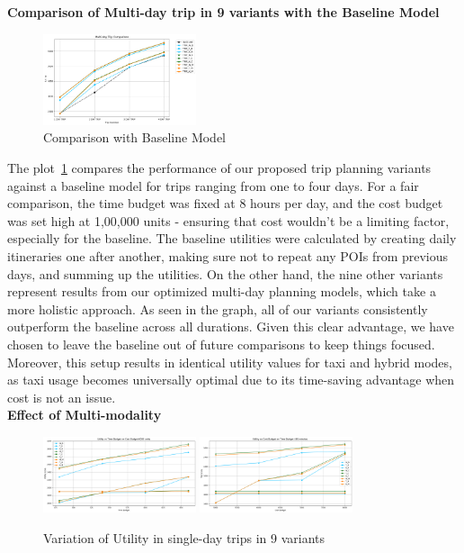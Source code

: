\newpage
\noindent \textbf{Comparison of Multi-day trip in 9 variants with the Baseline Model}
\begin{figure}[H]
\centering
\includegraphics[width=0.4\textwidth]{plots/baselineComparison.png}
\caption{Comparison with Baseline Model}
\label{fig:comparisonWithBaselinePlot}
\end{figure}

The plot~\ref{fig:comparisonWithBaselinePlot} compares the performance of our proposed trip planning variants against a baseline model for trips ranging from one to four days. For a fair comparison, the time budget was fixed at 8 hours per day, and the cost budget was set high at 1,00,000 units - ensuring that cost wouldn’t be a limiting factor, especially for the baseline. The baseline utilities were calculated by creating daily itineraries one after another, making sure not to repeat any POIs from previous days, and summing up the utilities. On the other hand, the nine other variants represent results from our optimized multi-day planning models, which take a more holistic approach. As seen in the graph, all of our variants consistently outperform the baseline across all durations. Given this clear advantage, we have chosen to leave the baseline out of future comparisons to keep things focused. Moreover, this setup results in identical utility values for taxi and hybrid modes, as taxi usage becomes universally optimal due to its time-saving advantage when cost is not an issue. \\

\noindent\textbf{Effect of Multi-modality}

\begin{figure}[H]
\includegraphics[width=0.4\textwidth]{plots/multimodality1.png}
\label{fig:mm1}
\includegraphics[width=0.4\textwidth]{plots/multimodality2.png}
\caption{Variation of Utility in single-day trips in 9 variants}
\label{fig:mm2}
\end{figure}

